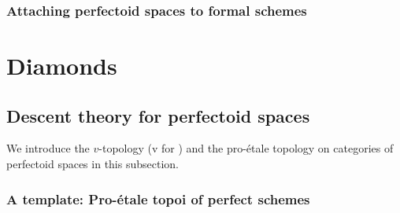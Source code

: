             \subsubsection{Attaching perfectoid spaces to formal schemes}
        
    \section{Diamonds} \label{section: diamonds}
        \subsection{Descent theory for perfectoid spaces}
            We introduce the $v$-topology (v for ) and the pro-\'etale topology on categories of perfectoid spaces in this subsection.
            
            \subsubsection{A template: Pro-\'etale topoi of perfect schemes} \label{subsection: pro_etale_topology_for_schemes}
